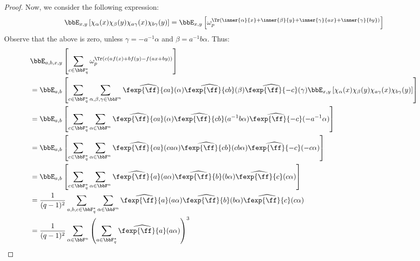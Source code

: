 \begin{proof}
Now, we consider the following expression:
\begin{align*}
    \bbE_{x,y}\left[\chi_{\alpha}(x)\chi_{\beta}(y)\chi_{a\gamma}(x)\chi_{b\gamma}(y)\right] = \bbE_{x,y}\left[\omega_p^{\Tr(\inner{\alpha}{x}+\inner{\beta}{y}+ \inner{\gamma}{ax}+\inner{\gamma}{by})}\right]
\end{align*}
Observe that the above is zero, unless $\gamma = -a^{-1}\alpha$ and $\beta = a^{-1}b\alpha$. Thus:
\begingroup
\allowdisplaybreaks
\begin{align*}
&\bbE_{a,b,x,y}\left[\sum_{c\in\bbF_q^{*}}\omega_p^{\Tr(c(af(x)+bf(y)-f(ax+by))}\right]\\
&=
\bbE_{a,b}\left[\sum_{c\in\bbF_q^{*}}\sum_{\alpha,\beta,\gamma\in\bbF^n}\widehat{\fexp{\ff}{ca}}(\alpha)\widehat{\fexp{\ff}{cb}}(\beta)\widehat{\fexp{\ff}{-c}}(\gamma)\bbE_{x,y}\left[\chi_{\alpha}(x)\chi_{\beta}(y)\chi_{a\gamma}(x)\chi_{b\gamma}(y)\right]\right] \\
&= 
\bbE_{a,b}\left[\sum_{c\in\bbF_q^{*}}\sum_{\alpha\in\bbF^n}\widehat{\fexp{\ff}{ca}}(\alpha)\widehat{\fexp{\ff}{cb}}(a^{-1}b\alpha)\widehat{\fexp{\ff}{-c}}(-a^{-1}\alpha)\right]\\
&=
\bbE_{a,b}\left[\sum_{c\in\bbF_q^{*}}\sum_{\alpha\in\bbF^n}\widehat{\fexp{\ff}{ca}}(ca\alpha)\widehat{\fexp{\ff}{cb}}(cb\alpha)\widehat{\fexp{\ff}{-c}}(-c\alpha)\right]\\
&= \bbE_{a,b}\left[\sum_{c\in\bbF_q^{*}}\sum_{\alpha\in\bbF^n}\widehat{\fexp{\ff}{a}}(a\alpha)\widehat{\fexp{\ff}{b}}(b\alpha)\widehat{\fexp{\ff}{c}}(c\alpha)\right]\\
&= \frac{1}{(q-1)^2}\sum_{a,b,c\in\bbF_q^{*}}\sum_{\alpha\in\bbF^n}\widehat{\fexp{\ff}{a}}(a\alpha)\widehat{\fexp{\ff}{b}}(b\alpha)\widehat{\fexp{\ff}{c}}(c\alpha)\\
&= \frac{1}{(q-1)^2}\sum_{\alpha\in\bbF^n}\left(\sum_{a\in\bbF_q^{*}}\widehat{\fexp{\ff}{a}}(a\alpha)\right)^3
\end{align*}
\endgroup

\end{proof}


